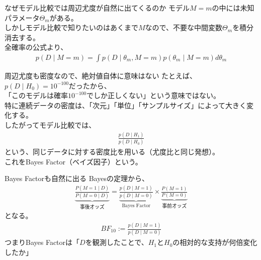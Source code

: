 \documentclass[dvipdfmx, 11pt, aspectratio=169, notheorems]{beamer}
\begin{document}
\begin{frame}{なぜモデル比較では周辺尤度が自然に出てくるのか}
    モデル$M=m$の中には未知パラメータ$\Theta_m$がある。\\
    しかしモデル比較で知りたいのはあくまで$M$なので、不要な中間変数$\Theta_m$を積分消去する。\\
    全確率の公式より、
    \begin{align}
        p(D\mid M=m) = \int p(D\mid \theta_m, M=m)p(\theta_m\mid M=m)d\theta_m
    \end{align}
\end{frame}

\begin{frame}{周辺尤度も密度なので、絶対値自体に意味はない}
    たとえば、$p(D\mid H_0)=10^{-100}$だったから、\\
    「このモデルは確率$10^{-100}$でしか正しくない」という意味ではない。\\
    特に連続データの密度は、「次元」「単位」「サンプルサイズ」によって大きく変化する。\\
    したがってモデル比較では、
    \begin{align}
        \frac{p(D\mid H_1)}{p(D\mid H_0)}
    \end{align}
    という、同じデータに対する密度比を用いる（尤度比と同じ発想）。\\
    これを\alert{Bayes Factor}（ベイズ因子）という。
\end{frame}

\begin{frame}{Bayes Factorも自然に出る}
    Bayesの定理から、
    \begin{align}
        \underbrace{\frac{P(M=1\mid D)}{P(M=0\mid D)}}_{\text{事後オッズ}} = \underbrace{\frac{p(D\mid M=1)}{p(D\mid M=0)}}_{\text{Bayes Factor}} \times \underbrace{\frac{P(M=1)}{P(M=0)}}_{\text{事前オッズ}}
    \end{align}
    となる。
    \begin{align}
        BF_{10} := \frac{p(D\mid M=1)}{p(D\mid M=0)}
    \end{align}
    つまりBayes Factorは「$D$を観測したことで、$H_1$と$H_0$の相対的な支持が何倍変化したか」
\end{frame}
\end{document}
